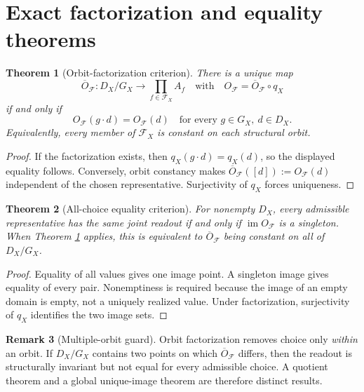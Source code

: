 \documentclass[11pt]{article}
\newtheorem{theorem}{Theorem}
\theoremstyle{definition}
\newtheorem{remark}[theorem]{Remark}
\newcommand{\im}{\operatorname{im}}
\begin{document}
\section{Exact factorization and equality theorems}

\begin{theorem}[Orbit-factorization criterion]
\label{thm:factor}
There is a unique map
\[
  \overline O_{\mathcal F}:D_X/G_X\longrightarrow
  \prod_{f\in\mathcal F_X}A_f
  \quad\text{with}\quad
  O_{\mathcal F}=\overline O_{\mathcal F}\circ q_X
\]
if and only if
\[
  O_{\mathcal F}(g\!\cdot\! d)=O_{\mathcal F}(d)
  \quad\text{for every }g\in G_X,\ d\in D_X.
\]
Equivalently, every member of $\mathcal F_X$ is constant on each structural
orbit.
\end{theorem}

\begin{proof}
If the factorization exists, then $q_X(g\cdot d)=q_X(d)$, so the displayed
equality follows.  Conversely, orbit constancy makes
$\overline O_{\mathcal F}([d]):=O_{\mathcal F}(d)$ independent of the chosen
representative.  Surjectivity of $q_X$ forces uniqueness.
\end{proof}

\begin{theorem}[All-choice equality criterion]
\label{thm:allchoice}
For nonempty $D_X$, every admissible representative has the same joint
readout if and only if $\im O_{\mathcal F}$ is a singleton.  When Theorem
\ref{thm:factor} applies, this is equivalent to
$\overline O_{\mathcal F}$ being constant on all of $D_X/G_X$.
\end{theorem}

\begin{proof}
Equality of all values gives one image point.  A singleton image gives
equality of every pair.  Nonemptiness is required because the image of an
empty domain is empty, not a uniquely realized value.  Under factorization,
surjectivity of $q_X$ identifies the two image sets.
\end{proof}

\begin{remark}[Multiple-orbit guard]
Orbit factorization removes choice only \emph{within} an orbit.  If
$D_X/G_X$ contains two points on which $\overline O_{\mathcal F}$ differs,
then the readout is structurally invariant but not equal for every admissible
choice.  A quotient theorem and a global unique-image theorem are therefore
distinct results.
\end{remark}
\end{document}
